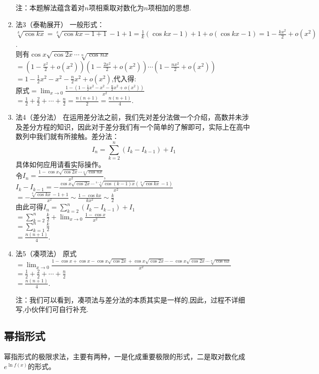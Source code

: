\begin{solution}
\begin{enumerate}
		      注：本题解法蕴含着对$n$项相乘取对数化为$n$项相加的思想.
		\item 法3（泰勒展开）
		      一般形式：$\sqrt[k]{\cos kx}=\sqrt[k]{\cos kx -1+1}-1+1=\frac{1}{k}(\cos kx-1)+1+o(\cos kx-1)=1-\frac{kx^2}{2}+o(x^2)$.\\
		      则有$\cos x \sqrt{\cos2x} \cdots \sqrt[n]{\cos nx}$\\
		      $=(1-\frac{x^2}{2}+o(x^2))(1-\frac{2x^2}{2}+o(x^2))\cdots(1-\frac{nx^2}{2}+o(x^2))$\\
		      $=1-\frac{1}{2}x^2-x^2-\frac{n}{2}x^2+o(x^2)$,代入得:\\
		      原式$=\lim_{x \to 0}\frac{1-(1-\frac{1}{2}x^2-x^2-\frac{n}{2}x^2+o(x^2))}{x^2}$\\
		      $=\frac{1}{2}+\frac{2}{2}+\cdots+\frac{n}{2}=\frac{n(n+1)}{2}=\frac{n(n+1)}{4}$.
		\item 法4（差分法）
		      在运用差分法之前，我们先对差分法做一个介绍，高数并未涉及差分方程的知识，因此对于差分我们有一个简单的了解即可，实际上在高中数列中我们就有所接触。差分法：$$I_n=\sum_{k=2}^{n}(I_k-I_{k-1})+I_1$$具体如何应用请看实际操作。\\
		      令$I_n=\frac{1-\cos x \sqrt{\cos2x} \cdots \sqrt[n]{\cos nx}}{x^2}$,\\
		      $I_k-I_{k-1}=-\frac{\cos x \sqrt{\cos2x} \cdots \sqrt[k-1]{\cos (k-1)x}(\sqrt[k]{\cos kx}-1)}{x^2}$\\
		      $=-\frac{\sqrt[k]{\cos kx}-1+1}{x^2}\sim \frac{1-\cos kx}{kx^2}\sim \frac{k}{2}$\\
		      由此可得$I_n=\sum_{k=2}^{n}(I_k-I_{k-1})+I_1$\\
		      $=\sum_{k=2}^{n}\frac{k}{2}+\lim_{x \to 0}\frac{1-\cos x}{x^2}$\\
		      $=\sum_{k=1}^{n}\frac{k}{2}$\\
		      $=\frac{n(n+1)}{4}$.
		\item 法5（凑项法）
		      原式$=\lim_{x \to 0}\frac{1-\cos x+\cos x-\cos x\sqrt{\cos 2x}+\cos x\sqrt{\cos 2x}\cdots-\cos x \sqrt{\cos2x} \cdots \sqrt[n]{\cos nx}}{x^2}$\\
		      $=\frac{1}{2}+\frac{2}{2}+\cdots+\frac{n}{2}$\\
		      $=\frac{n(n+1)}{4}$.

		      注：我们可以看到，凑项法与差分法的本质其实是一样的,因此，过程不详细写,小伙伴们可自行补充.
	\end{enumerate}
\end{solution}

\subsection{幂指形式}
幂指形式的极限求法，主要有两种，一是化成重要极限的形式，二是取对数化成$e^{\ln f(x)}$的形式。

